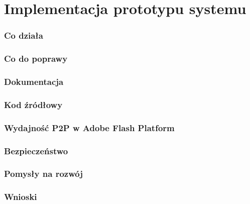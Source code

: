 \chapter{Implementacja prototypu systemu}
\label{cha:ImplementacjaPrototypu}

\subsection{Co działa}

\subsection{Co do poprawy}

\subsection{Dokumentacja}

\subsection{Kod źródłowy}

\subsection{Wydajność P2P w Adobe Flash Platform}

\subsection{Bezpieczeństwo}

\subsection{Pomysły na rozwój}

\subsection{Wnioski}


\newpage
